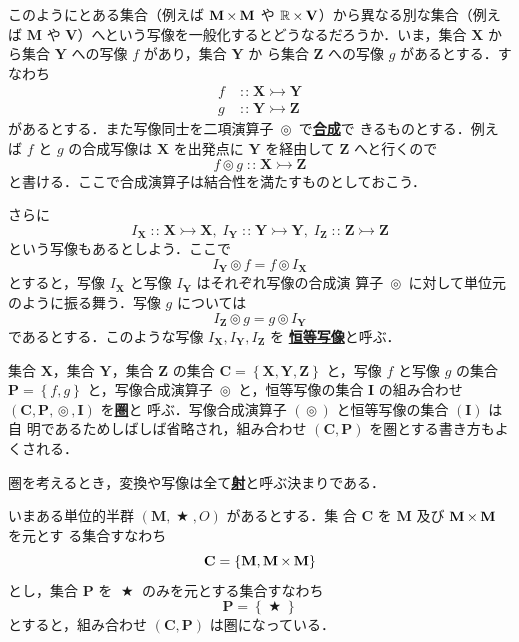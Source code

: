\documentclass[a5paper,twoside,fleqn]{jsbook}
\newcommand{\keyword}[1]{{\underline{\textbf{#1}}}}
\DeclareMathOperator{\mBinOp}{\bigstar}
\DeclareMathOperator{\mCompProj}{\circledcirc}
\DeclareMathOperator{\mIn}{{:\!:}}
\DeclareMathOperator{\mMorphTo}{\rightarrowtail}
\DeclareMathOperator{\mSetTimes}{\boldmath{\times}}
\newcommand{\mSet}[1]{\mathbf{#1}}
\newcommand{\mSpecialSet}[1]{\mathbb{#1}} %
\newcommand{\mRSet}{\mSpecialSet{R}}
\newcommand{\mSetWith}[1]{\left\{#1\right\}}
\newcommand{\mTupleWith}[1]{\left(#1\right)}
\newcommand{\mMorph}[2]{#1\mMorphTo#2}
\begin{document}
このようにとある集合（例えば $\mSet{M}\mSetTimes\mSet{M}$ や
$\mRSet\mSetTimes\mSet{V}$）から異なる別な集合（例えば $\mSet{M}$ や
$\mSet{V}$）へという写像を一般化するとどうなるだろうか．いま，集合
$\mSet{X}$ から集合 $\mSet{Y}$ への写像 $f$ があり，集合 $\mSet{Y}$ か
ら集合 $\mSet{Z}$ への写像 $g$ があるとする．すなわち
\begin{align}
f&\mIn\mMorph{\mSet{X}}{\mSet{Y}}\\
g&\mIn\mMorph{\mSet{Y}}{\mSet{Z}}
\end{align}
があるとする．また写像同士を二項演算子 $\mCompProj$ で\keyword{合成}で
きるものとする．例えば $f$ と $g$ の合成写像は $\mSet{X}$ を出発点に
$\mSet{Y}$ を経由して $\mSet{Z}$ へと行くので
\begin{equation}
f\mCompProj g\mIn\mMorph{\mSet{X}}{\mSet{Z}}
\end{equation}
と書ける．ここで合成演算子は結合性を満たすものとしておこう．

さらに
\begin{equation}
I_\mSet{X}\mIn\mMorph{\mSet{X}}{\mSet{X}},\;
I_\mSet{Y}\mIn\mMorph{\mSet{Y}}{\mSet{Y}},\;
I_\mSet{Z}\mIn\mMorph{\mSet{Z}}{\mSet{Z}}
\end{equation}
という写像もあるとしよう．ここで
\begin{equation}
I_\mSet{Y}\mCompProj f=f\mCompProj I_\mSet{X}
\end{equation}
とすると，写像 $I_\mSet{X}$ と写像 $I_\mSet{Y}$ はそれぞれ写像の合成演
算子 $\mCompProj$ に対して単位元のように振る舞う．写像 $g$ については
\begin{equation}
I_\mSet{Z}\mCompProj g=g\mCompProj I_\mSet{Y}
\end{equation}
であるとする．このような写像 $I_\mSet{X},I_\mSet{Y},I_\mSet{Z}$ を
\keyword{恒等写像}と呼ぶ．

集合 $\mSet{X}$，集合 $\mSet{Y}$，集合 $\mSet{Z}$ の集合
$\mSet{C}=\mSetWith{\mSet{X},\mSet{Y},\mSet{Z}}$ と，写像 $f$ と写像
$g$ の集合 $\mSet{P}=\mSetWith{f,g}$ と，写像合成演算子 $\mCompProj$
と，恒等写像の集合 $\mSet{I}$ の組み合わせ
$\mTupleWith{\mSet{C},\mSet{P},\mCompProj,\mSet{I}}$ を\keyword{圏}と
呼ぶ．写像合成演算子 $(\mCompProj)$ と恒等写像の集合 $(\mSet{I})$ は自
明であるためしばしば省略され，組み合わせ
$\mTupleWith{\mSet{C},\mSet{P}}$ を圏とする書き方もよくされる．

圏を考えるとき，変換や写像は全て\keyword{射}と呼ぶ決まりである．

いまある単位的半群 $\mTupleWith{\mSet{M},\mBinOp,O}$ があるとする．集
合 $\mSet{C}$ を $\mSet{M}$ 及び $\mSet{M}\mSetTimes\mSet{M}$ を元とす
る集合すなわち
\begin{equation}
\mSet{C}=\mSetWith{\mSet{M},\mSet{M}\mSetTimes\mSet{M}}
\end{equation}
とし，集合 $\mSet{P}$ を $\mBinOp$ のみを元とする集合すなわち
\begin{equation}
\mSet{P}=\mSetWith{\mBinOp}
\end{equation}
とすると，組み合わせ $\mTupleWith{\mSet{C},\mSet{P}}$ は圏になっている．
\end{document}
